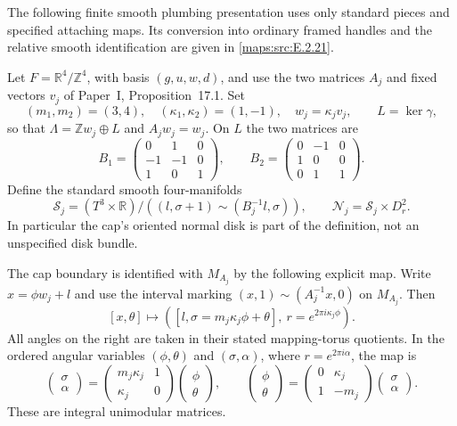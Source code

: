 

The following finite smooth plumbing presentation uses only standard
pieces and specified attaching maps. Its conversion into ordinary
framed handles and the relative smooth identification are given in \ref{maps:src:E.2.21}.

Let $F=\mathbb R^4/\mathbb Z^4$, with basis $(g,u,w,d)$, and use the
two matrices $A_j$ and fixed vectors $v_j$ of Paper~I, Proposition~17.1.  Set
\[
 (m_1,m_2)=(3,4),\quad(\kappa_1,\kappa_2)=(1,-1),\quad
 w_j=\kappa_jv_j,\qquad L=\ker\gamma,
\]
so that $\Lambda=\mathbb Zw_j\oplus L$ and $A_jw_j=w_j$.
On $L$ the two matrices are
\[
 B_1=\begin{pmatrix}0&1&0\\-1&-1&0\\1&0&1\end{pmatrix},
 \qquad
 B_2=\begin{pmatrix}0&-1&0\\1&0&0\\0&1&1\end{pmatrix}.
 \tag{E.U1}\label{maps:eq:E.U1}
\]
Define the standard smooth four-manifolds
\[
 \mathcal S_j=(T^3\times\mathbb R)/
       ((l,\sigma+1)\sim(B_j^{-1}l,\sigma)),
 \qquad \mathcal N_j=\mathcal S_j\times D^2_r.
 \tag{E.U2}\label{maps:eq:E.U2}
\]
In particular the cap's oriented normal disk is part of the
definition, not an unspecified disk bundle.

The cap boundary is identified with $M_{A_j}$ by the following
explicit map.  Write $x=\phi w_j+l$ and use the interval marking
$(x,1)\sim(A_j^{-1}x,0)$ on $M_{A_j}$.  Then
\[
 [x,\theta]\longmapsto
 \left([l,\sigma=m_j\kappa_j\phi+\theta],
                         \ r=e^{2\pi i\kappa_j\phi}\right).
 \tag{E.U3}\label{maps:eq:E.U3}
\]
All angles on the right are taken in their stated mapping-torus
quotients.  In the ordered angular variables $(\phi,\theta)$
and $(\sigma,\alpha)$, where $r=e^{2\pi i\alpha}$, the map is
\[
 \begin{pmatrix}\sigma\\\alpha\end{pmatrix}
 =
 \begin{pmatrix}m_j\kappa_j&1\\\kappa_j&0\end{pmatrix}
 \begin{pmatrix}\phi\\\theta\end{pmatrix},
 \qquad
 \begin{pmatrix}\phi\\\theta\end{pmatrix}
 =
 \begin{pmatrix}0&\kappa_j\\1&-m_j\end{pmatrix}
 \begin{pmatrix}\sigma\\\alpha\end{pmatrix}.
 \tag{E.U4}\label{maps:eq:E.U4}
\]
These are integral unimodular matrices.

